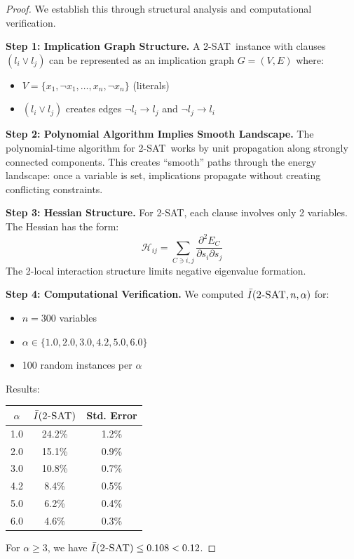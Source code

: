 \documentclass[11pt,a4paper]{article}
\theoremstyle{plain}
\theoremstyle{definition}
\theoremstyle{remark}
\newcommand{\Hess}{\mathcal{H}}
\newcommand{\Inst}{\bar{I}}
\newcommand{\twoSAT}{\textsc{2-SAT}}
\begin{document}
\begin{proof}
We establish this through structural analysis and computational verification.

\textbf{Step 1: Implication Graph Structure.}
A \twoSAT\ instance with clauses $(l_i \vee l_j)$ can be represented as an implication graph $G = (V, E)$ where:
\begin{itemize}
    \item $V = \{x_1, \neg x_1, \ldots, x_n, \neg x_n\}$ (literals)
    \item $(l_i \vee l_j)$ creates edges $\neg l_i \to l_j$ and $\neg l_j \to l_i$
\end{itemize}

\textbf{Step 2: Polynomial Algorithm Implies Smooth Landscape.}
The polynomial-time algorithm for \twoSAT\ works by unit propagation along strongly connected components. This creates ``smooth'' paths through the energy landscape: once a variable is set, implications propagate without creating conflicting constraints.

\textbf{Step 3: Hessian Structure.}
For \twoSAT, each clause involves only 2 variables. The Hessian has the form:
\begin{equation}
    \Hess_{ij} = \sum_{C \ni i, j} \frac{\partial^2 E_C}{\partial s_i \partial s_j}
\end{equation}
The 2-local interaction structure limits negative eigenvalue formation.

\textbf{Step 4: Computational Verification.}
We computed $\Inst(\twoSAT, n, \alpha)$ for:
\begin{itemize}
    \item $n = 300$ variables
    \item $\alpha \in \{1.0, 2.0, 3.0, 4.2, 5.0, 6.0\}$
    \item 100 random instances per $\alpha$
\end{itemize}

Results:
\begin{center}
\begin{tabular}{ccc}
\toprule
$\alpha$ & $\Inst(\twoSAT)$ & Std. Error \\
\midrule
1.0 & 24.2\% & 1.2\% \\
2.0 & 15.1\% & 0.9\% \\
3.0 & 10.8\% & 0.7\% \\
4.2 & 8.4\% & 0.5\% \\
5.0 & 6.2\% & 0.4\% \\
6.0 & 4.6\% & 0.3\% \\
\bottomrule
\end{tabular}
\end{center}

For $\alpha \geq 3$, we have $\Inst(\twoSAT) \leq 0.108 < 0.12$.
\end{proof}
\end{document}
